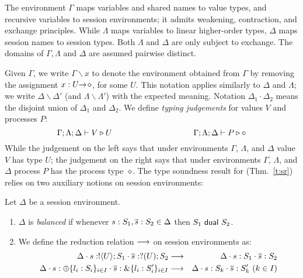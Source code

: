 The environment $\Gamma$ maps variables and shared names to value types, and recursive 
variables to session environments;  
it admits weakening, contraction, and exchange principles.
While  $\Lambda$ maps variables to 
 linear %
higher-order
types, $\Delta$ maps
session names to session types. 
Both $\Lambda$ and $\Delta$ %
are
only subject to exchange.  
The domains of $\Gamma,
\Lambda$ and $\Delta$ are assumed pairwise distinct. 

Given $\Gamma$, we write $\Gamma \backslash x$ to denote the environment obtained from 
 $\Gamma$ by removing the assignment $x:U\!\! \rightarrow\! \diamond$, for some $U$.
This notation applies similarly to $\Delta$ and $\Lambda$; 
we write $\Delta \backslash \Delta'$ (and $\Lambda \backslash \Lambda'$) with the expected meaning.
Notation
$\Delta_1\cdot \Delta_2$ means 
the disjoint union of $\Delta_1$ and $\Delta_2$.  
We define \emph{typing judgements} for values $V$
and processes $P$:
	$$\Gamma; \Lambda; \Delta \vdash V \triangleright U \qquad \qquad \qquad \qquad \qquad \Gamma; \Lambda; \Delta \vdash P \triangleright \diamond$$
While the judgement on the left
says that under environments $\Gamma$, $\Lambda$, and $\Delta$ value $V$
has type $U$; the  judgement on the right says that under
environments $\Gamma$, $\Lambda$, and $\Delta$ process $P$ has the process type~$\diamond$.
The type soundness result for \HOp (Thm.~\ref{t:sr})
relies on two auxiliary notions on session environments: 


\begin{definition}\label{d:wtenvred}%
	Let $\Delta$ be a session environment.
	\begin{enumerate}[$\bullet$]
	\item  $\Delta$ is {\em balanced} if whenever
	$s: S_1, \overline{s}: S_2 \in \Delta$ then $S_1 \ \mathsf{dual}\  S_2$.
	\item We define the reduction relation $\longrightarrow$ on session environments as: %
\begin{eqnarray*}
	\Delta \cat s: \btout{U} S_1 \cat \dual{s}: \btinp{U} S_2  & \red & 
	\Delta \cat s: S_1 \cat \dual{s}: S_2  \\
	\Delta \cat s: \btsel{l_i: S_i}_{i \in I} \cat \dual{s}: \btbra{l_i: S_i'}_{i \in I} &\red& \Delta \cat s: S_k \cat \dual{s}: S_k' \ (k \in I)
\end{eqnarray*}
\end{enumerate}
\end{definition}

